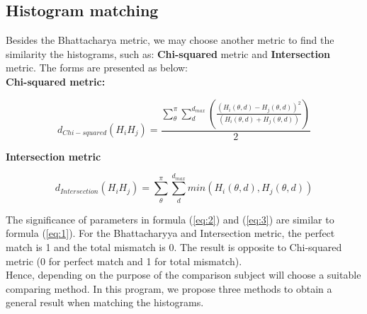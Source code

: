 \subsection{Histogram matching}
Besides the Bhattacharya metric, we may choose another metric to find the similarity the histograms, such as: \textbf{Chi-squared} metric and \textbf{Intersection} metric. The forms are presented as below:\\
\textbf{Chi-squared metric:}
\begin{center}
\begin{equation}\label{eq:2}
d_{Chi-squared} (H_{i}H_{j}) = \frac{\sum\limits_{\theta}^{\pi}\sum\limits_{d}^{d_{max}}(\frac{(H_{i}(\theta,d) - H_{j}(\theta,d))^{2}}{(H_{i}(\theta,d) + H_{j}(\theta,d))})}{2}
\end{equation}
\end{center}
\textbf{Intersection metric}
\begin{center}
\begin{equation}\label{eq:3}
d_{Intersection} (H_{i}H_{j}) = \sum\limits_{\theta}^{\pi}\sum\limits_{d}^{d_{max}}min(H_{i}(\theta,d), H_{j}(\theta,d))
\end{equation}
\end{center}
The significance of parameters in formula (\ref{eq:2}) and (\ref{eq:3}) are similar to formula (\ref{eq:1}). For the Bhattacharyya and Intersection metric, the perfect match is 1 and the total mismatch is 0. The result is opposite to Chi-squared metric (0 for perfect match and 1 for total mismatch).\\[0.2cm]
Hence, depending on the purpose of the comparison subject will choose a suitable comparing method. In this program, we propose three methods to obtain a general result when matching the histograms.
